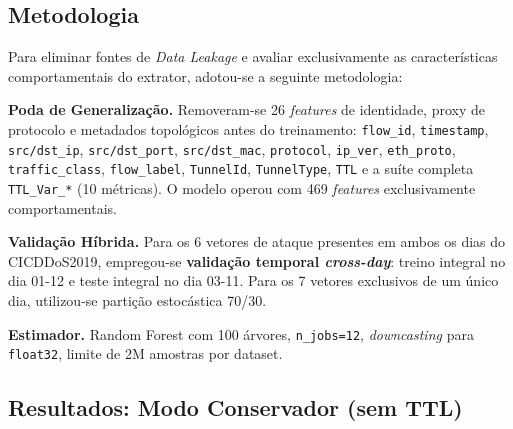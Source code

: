 \documentclass[12pt,a4paper]{article}
\begin{document}
\subsection{Metodologia}

Para eliminar fontes de \textit{Data Leakage} e avaliar exclusivamente as caracter\'{i}sticas comportamentais do extrator, adotou-se a seguinte metodologia:

\textbf{Poda de Generaliza\c{c}\~{a}o.} Removeram-se 26 \textit{features} de identidade, proxy de protocolo e metadados topol\'{o}gicos antes do treinamento: \texttt{flow\_id}, \texttt{timestamp}, \texttt{src/dst\_ip}, \texttt{src/dst\_port}, \texttt{src/dst\_mac}, \texttt{protocol}, \texttt{ip\_ver}, \texttt{eth\_proto}, \texttt{traffic\_class}, \texttt{flow\_label}, \texttt{TunnelId}, \texttt{TunnelType}, \texttt{TTL} e a su\'{i}te completa \texttt{TTL\_Var\_*} (10 m\'{e}tricas). O modelo operou com 469 \textit{features} exclusivamente comportamentais.

\textbf{Valida\c{c}\~{a}o H\'{i}brida.} Para os 6 vetores de ataque presentes em ambos os dias do CICDDoS2019, empregou-se \textbf{valida\c{c}\~{a}o temporal \textit{cross-day}}: treino integral no dia 01-12 e teste integral no dia 03-11. Para os 7 vetores exclusivos de um \'{u}nico dia, utilizou-se parti\c{c}\~{a}o estoc\'{a}stica 70/30.

\textbf{Estimador.} Random Forest com 100 \'{a}rvores, \texttt{n\_jobs=12}, \textit{downcasting} para \texttt{float32}, limite de 2M amostras por dataset.

\subsection{Resultados: Modo Conservador (sem TTL)}
\end{document}
